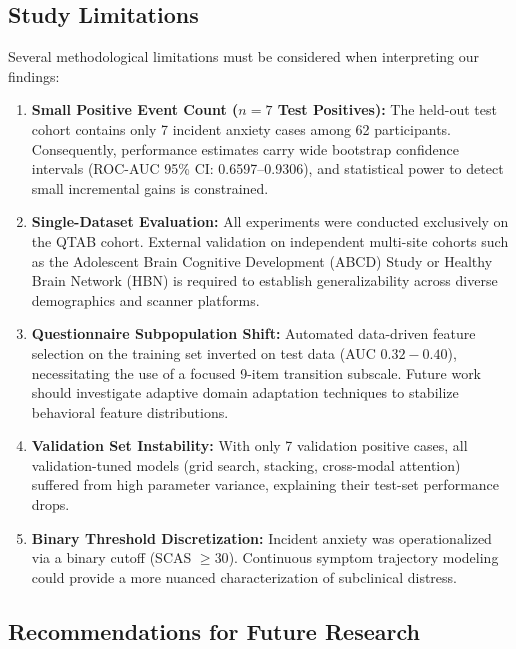 \documentclass[10pt,letterpaper]{article}
\begin{document}
\subsection*{Study Limitations}

Several methodological limitations must be considered when interpreting our findings:
\begin{enumerate}
    \item \textbf{Small Positive Event Count ($n=7$ Test Positives):} The held-out test cohort contains only 7 incident anxiety cases among 62 participants. Consequently, performance estimates carry wide bootstrap confidence intervals (ROC-AUC 95\% CI: 0.6597--0.9306), and statistical power to detect small incremental gains is constrained.
    \item \textbf{Single-Dataset Evaluation:} All experiments were conducted exclusively on the QTAB cohort. External validation on independent multi-site cohorts such as the Adolescent Brain Cognitive Development (ABCD) Study or Healthy Brain Network (HBN) is required to establish generalizability across diverse demographics and scanner platforms.
    \item \textbf{Questionnaire Subpopulation Shift:} Automated data-driven feature selection on the training set inverted on test data (AUC $0.32-0.40$), necessitating the use of a focused 9-item transition subscale. Future work should investigate adaptive domain adaptation techniques to stabilize behavioral feature distributions.
    \item \textbf{Validation Set Instability:} With only 7 validation positive cases, all validation-tuned models (grid search, stacking, cross-modal attention) suffered from high parameter variance, explaining their test-set performance drops.
    \item \textbf{Binary Threshold Discretization:} Incident anxiety was operationalized via a binary cutoff (SCAS $\ge 30$). Continuous symptom trajectory modeling could provide a more nuanced characterization of subclinical distress.
\end{enumerate}

\subsection*{Recommendations for Future Research}
\end{document}
